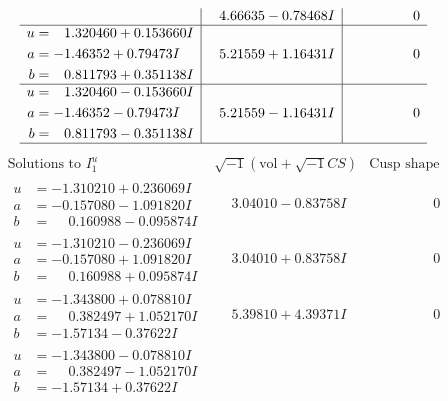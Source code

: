 \documentclass[1p]{elsarticle_modified}
\theoremstyle{definition}
\newcommand{\I}{\sqrt{-1}}
\begin{document}
$$\begin{array}{c|c|c}
 & \phantom{-}4.66635 - 0.78468 I & \phantom{-0.000000 } 0 \\ \hline\begin{aligned}
u &= \phantom{-}1.320460 + 0.153660 I \\
a &= -1.46352 + 0.79473 I \\
b &= \phantom{-}0.811793 + 0.351138 I\end{aligned}
 & \phantom{-}5.21559 + 1.16431 I & \phantom{-0.000000 } 0 \\ \hline\begin{aligned}
u &= \phantom{-}1.320460 - 0.153660 I \\
a &= -1.46352 - 0.79473 I \\
b &= \phantom{-}0.811793 - 0.351138 I\end{aligned}
 & \phantom{-}5.21559 - 1.16431 I & \phantom{-0.000000 } 0\\
 \hline 
 \end{array}$$\newpage$$\begin{array}{c|c|c}  
\text{Solutions to }I^u_{1}& \I (\text{vol} + \sqrt{-1}CS) & \text{Cusp shape}\\
 \hline 
\begin{aligned}
u &= -1.310210 + 0.236069 I \\
a &= -0.157080 - 1.091820 I \\
b &= \phantom{-}0.160988 - 0.095874 I\end{aligned}
 & \phantom{-}3.04010 - 0.83758 I & \phantom{-0.000000 } 0 \\ \hline\begin{aligned}
u &= -1.310210 - 0.236069 I \\
a &= -0.157080 + 1.091820 I \\
b &= \phantom{-}0.160988 + 0.095874 I\end{aligned}
 & \phantom{-}3.04010 + 0.83758 I & \phantom{-0.000000 } 0 \\ \hline\begin{aligned}
u &= -1.343800 + 0.078810 I \\
a &= \phantom{-}0.382497 + 1.052170 I \\
b &= -1.57134 - 0.37622 I\end{aligned}
 & \phantom{-}5.39810 + 4.39371 I & \phantom{-0.000000 } 0 \\ \hline\begin{aligned}
u &= -1.343800 - 0.078810 I \\
a &= \phantom{-}0.382497 - 1.052170 I \\
b &= -1.57134 + 0.37622 I\end{aligned}

\end{array}$$
\end{document}
